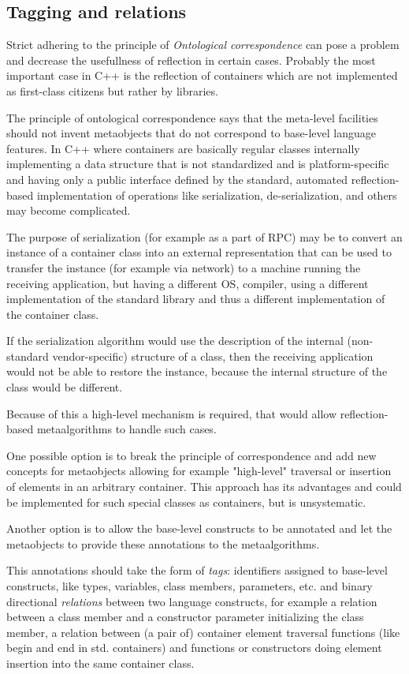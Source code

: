 \subsection{Tagging and relations}

Strict adhering to the principle of {\em Ontological correspondence} can pose
a problem and decrease the usefullness of reflection in certain cases.
Probably the most important case in C++ is the reflection of containers
which are not implemented as first-class citizens but rather by libraries.

The principle of ontological correspondence says that the meta-level facilities
should not invent metaobjects that do not correspond to base-level
language features. In C++ where containers are basically regular
classes internally implementing a data structure that is not standardized
and is platform-specific and having only a public interface defined 
by the standard, automated reflection-based implementation of operations
like serialization, de-serialization, and others may become complicated.

The purpose of serialization (for example as a part of RPC) may be to
convert an instance of a container class into an external representation
that can be used to transfer the instance (for example via network) 
to a machine running the receiving application, but having a different
OS, compiler, using a different implementation of the standard library
and thus a different implementation of the container class.

If the serialization algorithm would use the description of the internal
(non-standard vendor-specific) structure of a class, then the receiving
application would not be able to restore the instance, because the 
internal structure of the class would be different.

Because of this a high-level mechanism is required, that would allow
reflection-based metaalgorithms to handle such cases.

One possible option is to break the principle of correspondence
and add new concepts for metaobjects allowing for example
"high-level" traversal or insertion of elements in an arbitrary
container. This approach has its advantages and could be implemented
for such special classes as containers, but is unsystematic.

Another option is to allow the base-level constructs to be annotated
and let the metaobjects to provide these annotations to the metaalgorithms.

This annotations should take the form of {\em tags}: identifiers assigned
to base-level constructs, like types, variables, class members, parameters,
etc. and binary directional {\em relations} between two language constructs,
for example a relation between a class member and a constructor parameter
initializing the class member, a relation between (a pair of) container
element traversal functions (like begin and end in std. containers) and 
functions or constructors doing element insertion into the same container
class.
